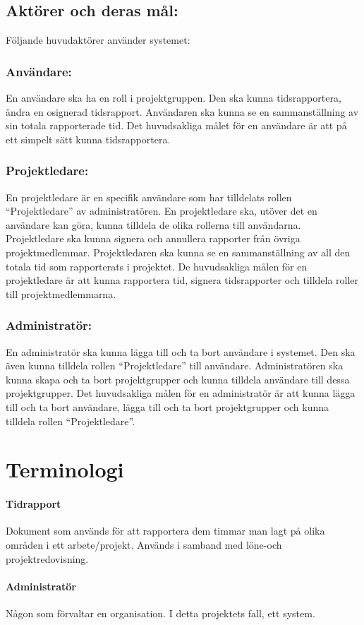 \documentclass[paper=a4, fontsize=11pt,twoside]{article}
\begin{document}
\subsection{Aktörer och deras mål:}
Följande huvudaktörer använder systemet:
\subsubsection{Användare:}
En användare ska ha en roll i projektgruppen. Den ska kunna tidsrapportera, ändra en osignerad tidsrapport. Användaren ska kunna se en sammanställning av sin totala rapporterade tid. Det huvudsakliga målet för en användare är att på ett simpelt sätt kunna tidsrapportera.
\subsubsection{Projektledare:}
En projektledare är en specifik användare som har tilldelats rollen “Projektledare” av administratören. En projektledare ska, utöver det en användare kan göra, kunna tilldela de olika rollerna till användarna. Projektledare ska kunna signera och annullera rapporter från övriga projektmedlemmar. Projektledaren ska kunna se en sammanställning av all den totala tid som rapporterats i projektet. De huvudsakliga målen för en projektledare är att kunna rapportera tid, signera tidsrapporter och tilldela roller till projektmedlemmarna. 
\subsubsection{Administratör:}
En administratör ska kunna lägga till och ta bort användare i systemet. Den ska även kunna tilldela rollen “Projektledare” till användare. Administratören ska kunna skapa och ta bort projektgrupper och kunna tilldela användare till dessa projektgrupper. Det huvudsakliga målen för en administratör är att kunna lägga till och ta bort användare, lägga till och ta bort projektgrupper och kunna tilldela rollen “Projektledare”.

\section{Terminologi}
\paragraph{Tidrapport}
Dokument som används för att rapportera dem timmar man lagt på olika områden i ett arbete/projekt. Används i samband med löne-och projektredovisning.
\paragraph{Administratör}
Någon som förvaltar en organisation. I detta projektets fall, ett system.
\end{document}
